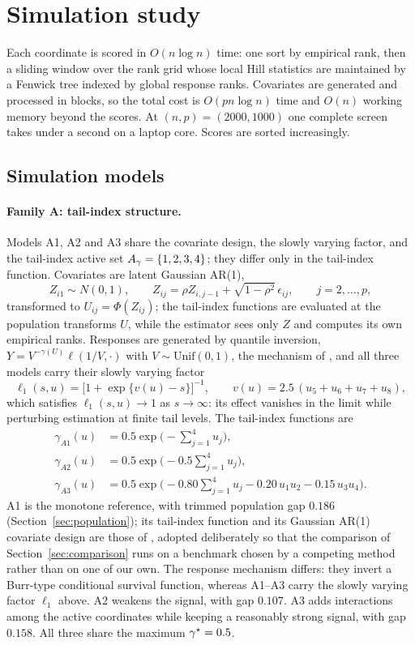 \section{Simulation study}\label{sec:simulation}

Each coordinate is scored in $O(n\log n)$ time: one sort by empirical
rank, then a sliding window over the rank grid whose local Hill statistics
are maintained by a Fenwick tree indexed by global response ranks.
Covariates are generated and processed in blocks, so the total cost is
$O(pn\log n)$ time and $O(n)$ working memory beyond the scores. At
$(n,p)=(2000,1000)$ one complete screen takes under a second on a laptop
core. Scores are sorted increasingly.

\subsection{Simulation models}\label{sec:models}

\paragraph{Family A: tail-index structure.}
Models A1, A2 and A3 share the covariate design, the slowly varying
factor, and the tail-index active set $A_\gamma=\{1,2,3,4\}$; they
differ only in the tail-index function. Covariates are latent Gaussian
AR(1),
\[
 Z_{i1}\sim N(0,1),\qquad
 Z_{ij}=\rho Z_{i,j-1}+\sqrt{1-\rho^2}\,\epsilon_{ij},
 \qquad j=2,\ldots,p,
\]
transformed to $U_{ij}=\Phi(Z_{ij})$; the tail-index functions are
evaluated at the population transforms $U$, while the estimator sees
only $Z$ and computes its own empirical ranks. Responses are generated
by quantile inversion, $Y=V^{-\gamma(U)}\ell(1/V,\cdot)$ with
$V\sim\mathrm{Unif}(0,1)$, the mechanism of
\citet{gardesPodgorny2025}, and all three models carry their slowly
varying factor
\[
 \ell_1(s,u)=\bigl[1+\exp\{v(u)-s\}\bigr]^{-1},
 \qquad
 v(u)=2.5\,(u_5+u_6+u_7+u_8),
\]
which satisfies $\ell_1(s,u)\to1$ as $s\to\infty$: its effect vanishes
in the limit while perturbing estimation at finite tail levels. The
tail-index functions are
\begin{align*}
 \gamma_{A1}(u)&=0.5\exp\bigl(-\textstyle\sum_{j=1}^4u_j\bigr),\\
 \gamma_{A2}(u)&=0.5\exp\bigl(-0.5\textstyle\sum_{j=1}^4u_j\bigr),\\
 \gamma_{A3}(u)&=0.5\exp\bigl(-0.80\textstyle\sum_{j=1}^4u_j
 -0.20\,u_1u_2-0.15\,u_3u_4\bigr).
\end{align*}
A1 is the monotone reference, with trimmed population gap $0.186$
(Section~\ref{sec:population}); its tail-index function and its Gaussian
AR(1) covariate design are those of \citet{yoshidaUmezu2026}, adopted
deliberately so that the comparison of Section~\ref{sec:comparison} runs
on a benchmark chosen by a competing method rather than on one of our
own. The response mechanism differs: they invert a Burr-type conditional
survival function, whereas A1--A3 carry the slowly varying factor
$\ell_1$ above. A2 weakens the signal, with gap
$0.107$. A3 adds interactions among the active coordinates while
keeping a reasonably strong signal, with gap $0.158$. All three share
the maximum $\gamma^\star=0.5$.

